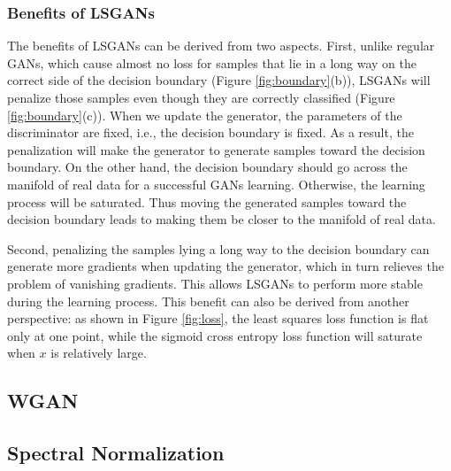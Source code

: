 \subsubsection{Benefits of LSGANs}
The benefits of LSGANs can be derived from two aspects. First, unlike regular GANs, which cause almost no loss for samples that lie in a long way on the correct side of the decision boundary (Figure \ref{fig:boundary}(b)), LSGANs will penalize those samples even though they are correctly classified (Figure \ref{fig:boundary}(c)). When we update the generator, the parameters of the discriminator are fixed, i.e., the decision boundary is fixed. As a result, the penalization will make the generator to generate samples toward the decision boundary. On the other hand, the decision boundary should go across the manifold of real data for a successful GANs learning. Otherwise, the learning process will be saturated. Thus moving the generated samples toward the decision boundary leads to making them be closer to the manifold of real data. 

Second, penalizing the samples lying a long way to the decision boundary can generate more gradients when updating the generator, which in turn relieves the problem of vanishing gradients. This allows LSGANs to perform more stable during the learning process. This benefit can also be derived from another perspective: as shown in Figure \ref{fig:loss}, the least squares loss function is flat only at one point, while the sigmoid cross entropy loss function will saturate when $x$ is relatively large.

\subsection{WGAN}

\subsection{Spectral Normalization}



